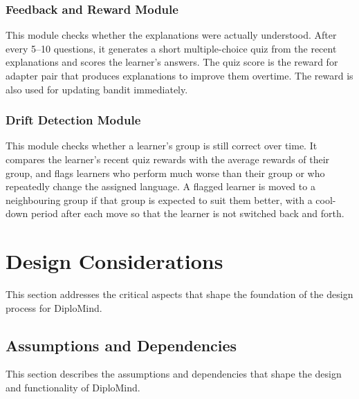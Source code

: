 \documentclass{FastFyp}
\begin{document}
\subsubsection{Feedback and Reward Module}
This module checks whether the explanations were actually understood. After every 5--10 questions, it generates a short multiple-choice quiz from the recent explanations and scores the learner's answers. The quiz score is the reward for adapter pair that produces explanations to improve them overtime. The reward is also used for updating bandit immediately.
 
\subsubsection{Drift Detection Module}
This module checks whether a learner's group is still correct over time. It compares the learner's recent quiz rewards with the average rewards of their group, and flags learners who perform much worse than their group or who repeatedly change the assigned language. A flagged learner is moved to a neighbouring group if that group is expected to suit them better, with a cool-down period after each move so that the learner is not switched back and forth.
 

\section{Design Considerations}
This section addresses the critical aspects that shape the foundation of the design process for DiploMind.
 
\subsection{Assumptions and Dependencies}
This section describes the assumptions and dependencies that shape the design and functionality of DiploMind.
 
\end{document}
